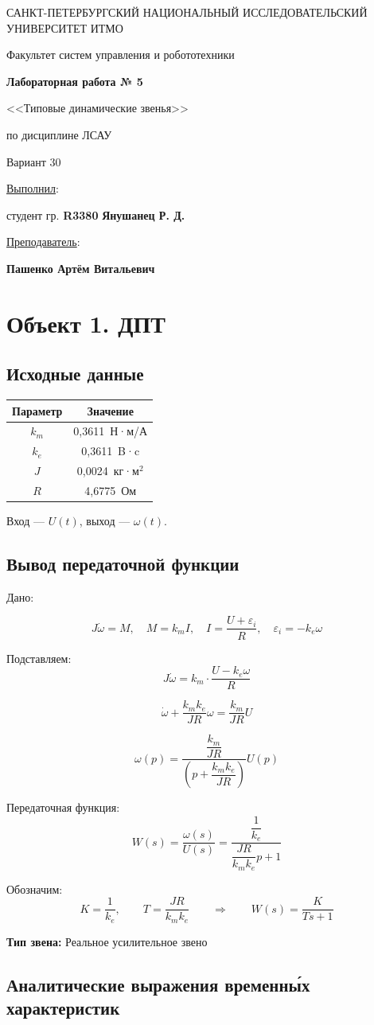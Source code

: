 \documentclass[a5paper, 10pt]{article}
\theoremstyle{definition}
\theoremstyle{plain}
\theoremstyle{remark}
\newcommand*{\titlePage}{
	\thispagestyle{title}
	\begingroup
	\begin{center}
		\vspace*{6ex}
		
		{\small
			САНКТ-ПЕТЕРБУРГСКИЙ НАЦИОНАЛЬНЫЙ ИССЛЕДОВАТЕЛЬСКИЙ УНИВЕРСИТЕТ ИТМО	
		}
		
		\vspace*{2ex}
		
		{\normalsize
			Факультет систем управления и робототехники
		}
		
		\vspace*{15ex}
		
		{\Large \bfseries 
			Лабораторная работа № 5
		}
\vspace*{2ex}
	{\Large \bfseries 
			
<<Типовые динамические звенья>>
		}
\vspace*{2ex}
		
		{\normalsize
			по дисциплине ЛСАУ
		}
\vspace*{2ex}
	{\Large \bfseries 
			
Вариант 30
		}

	\end{center}
	\vspace*{8ex}
	\begin{flushright}
		{\large 
			\underline{Выполнил}:\\
			\begin{flushright}
				студент гр. \textbf{R3380} \textbf{Янушанец Р. Д.}\\
			\end{flushright}
		}
		
		\vspace*{6ex}
		
		{\large 
			\underline{Преподаватель}:\\
            \begin{flushright}
            \textbf{Пашенко Артём Витальевич}
            \end{flushright}
		}
	\end{flushright}
	\newpage
	\setcounter{page}{1}
	\endgroup}
\begin{document}
	\titlePage
	\pagestyle{style}
\newpage

\tableofcontents

\newpage

\section{Объект 1. ДПТ}

\subsection{Исходные данные}
\begin{center}
\begin{tabular}{|c|c|}
\hline
Параметр & Значение \\ \hline
$k_m$ & 0,3611 \,Н·м/А \\ \hline
$k_e$&0,3611 \,B·c \\ \hline
$J$ & 0,0024 \,кг·м$^2$ \\ \hline
$R$ & 4,6775 \,Ом \\ \hline
\end{tabular}
\end{center}

Вход — $U(t)$, выход — $\omega(t)$.

\subsection{Вывод передаточной функции}

Дано:

$$
J \dot{\omega} = M,\quad M=k_mI, \quad I = \frac{U +\varepsilon_i}{R}, \quad \varepsilon_i=-k_e\omega
$$

Подставляем:
$$
J \dot{\omega} = k_m \cdot \frac{U - k_e \omega}{R}
$$

$$
\dot{\omega} + \frac{k_m k_e}{JR} \omega = \frac{k_m}{JR} U
$$

$$\omega(p) = \dfrac{\dfrac{k_m}{JR} }{\left( p + \dfrac{k_m k_e}{JR} \right)} U(p)$$

Передаточная функция:
$$
W(s) = \frac{\omega(s)}{U(s)} = \frac{\dfrac{1}{k_e}}{\dfrac{J R}{k_m k_e} p + 1}
$$

Обозначим:
$$
K = \frac{1}{k_e}, \qquad T = \frac{J R}{k_m k_e}
\qquad \Rightarrow \qquad
W(s) = \frac{K}{T s + 1}
$$

\textbf{Тип звена:} Реальное усилительное звено



\subsection{Аналитические выражения временны́х характеристик}
\end{document}

